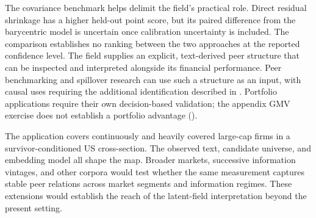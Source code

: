 The covariance benchmark helps delimit the field's practical role.
Direct residual shrinkage has a higher held-out point score, but its paired
difference from the barycentric model is uncertain once calibration
uncertainty is included.
The comparison establishes no ranking between the two approaches at the
reported confidence level.
The field supplies an explicit, text-derived peer structure that can be
inspected and interpreted alongside its financial performance.
Peer benchmarking and spillover research can use such a structure as an input,
with causal uses requiring the additional identification described in
.
Portfolio applications require their own decision-based validation; the
appendix GMV exercise does not establish a portfolio advantage
().

The application covers continuously and heavily covered large-cap firms in a
survivor-conditioned US cross-section.
The observed text, candidate universe, and embedding model all shape the map.
Broader markets, successive information vintages, and other corpora would
test whether the same measurement captures stable peer relations across
market segments and information regimes.
These extensions would establish the reach of the latent-field
interpretation beyond the present setting.
